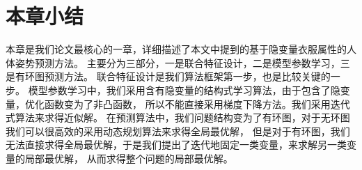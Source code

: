\section{本章小结}
本章是我们论文最核心的一章，详细描述了本文中提到的基于隐变量衣服属性的人体姿势预测方法。
主要分为三部分，一是联合特征设计，二是模型参数学习，三是有环图预测方法。
联合特征设计是我们算法框架第一步，也是比较关键的一步。
模型参数学习中，我们采用含有隐变量的结构式学习算法，由于包含了隐变量，优化函数变为了非凸函数，
所以不能直接采用梯度下降方法。我们采用迭代式算法来求得近似解。
在预测算法中，我们问题结构变为了有环图，对于无环图我们可以很高效的采用动态规划算法来求得全局最优解，
但是对于有环图，我们无法直接求得全局最优解，于是我们提出了迭代地固定一类变量，来求解另一类变量的局部最优解，
从而求得整个问题的局部最优解。

